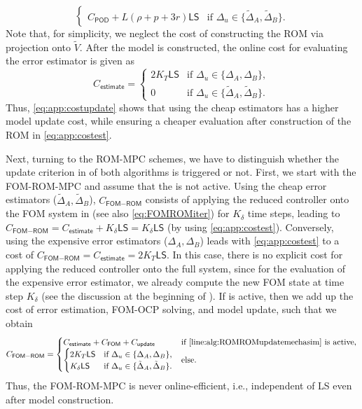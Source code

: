 \documentclass[reqno]{amsart}
\newcommand{\inpVarDim}{\rho}
\newcommand{\outVarDim}{p}
\newcommand{\nrModes}{L}
\newcommand{\abbr}[1]{\textsf{#1}\xspace}
\newcommand{\FOM}{\abbr{FOM}}
\newcommand{\ROM}{\abbr{ROM}}
\newcommand{\MPC}{\abbr{MPC}}
\newcommand{\OCP}{\abbr{OCP}}
\newcommand{\LS}{\abbr{LS}}
\newcommand{\cost}{C}
\newcommand{\costFOM}{\cost_{\FOM}}
\newcommand{\costFOMROM}{\cost_{\FOM-\ROM}}
\newcommand{\costUpdate}{\cost_{\textsf{update}}}
\newcommand{\costEst}{\cost_{\textsf{estimate}}}
\newcommand{\costPOD}{\cost_{\textsf{POD}}}
\begin{document}
{\begin{equation}
\begin{cases}
       \costPOD+\nrModes(\inpVarDim+\outVarDim+3r)\LS &\text{if }\Delta_u\in \{\tilde \Delta_A,\tilde \Delta_B\}.
	\end{cases}
\end{equation}
%
Note that, for simplicity, we neglect the cost of constructing the \ROM via projection onto $\tilde V$. After the model is constructed, the online cost for evaluating the error estimator is given as 
%
\begin{equation}\label{eq:app:costest}
    \costEst =
    \begin{cases}
        2K_T\LS &\text{if }\Delta_u\in \{\Delta_A,\Delta_B\},\\
       0 &\text{if }\Delta_u\in \{\tilde \Delta_A,\tilde \Delta_B\}.
	\end{cases}
\end{equation}
%
Thus, \eqref{eq:app:costupdate} shows that using the cheap estimators has a higher model update cost, while ensuring a cheaper evaluation after construction of the \ROM in \eqref{eq:app:costest}.

Next, turning to the \ROM-\MPC schemes, we have to distinguish whether the update criterion in  of both algorithms is triggered or not. First, we start with the \FOM-\ROM-\MPC and assume that the   is not active. Using the cheap error estimators ($\tilde \Delta_A,\tilde \Delta_B$), $\costFOMROM$ consists of applying the reduced controller onto the \FOM system in  (see also \eqref{eq:FOMROMiter}) for $K_\delta$ time steps, leading to $\costFOMROM= \costEst + K_\delta\LS= K_\delta\LS$ (by using \eqref{eq:app:costest}). Conversely, using the expensive error estimators ($ \Delta_A, \Delta_B$) leads with \eqref{eq:app:costest} to a cost of $\costFOMROM= \costEst= 2K_T\LS$. In this case, there is no explicit cost for applying the reduced controller onto the full system, since for the evaluation of the expensive error estimator, we already compute the new \FOM state at time step $K_\delta$ (see the discussion at the beginning of ). If  is active, then we add up the cost of error estimation, \FOM-\OCP solving, and model update, such that we obtain
%
\begin{equation}\label{eq:app:costFOMROM}
\costFOMROM= 
\begin{cases}
        \costEst + \costFOM + \costUpdate &\text{if \Cref{line:alg:ROMROMupdatemechasim} is active},\\
         \begin{cases}
        2K_T\LS &\text{if }\Delta_u\in \{\Delta_A,\Delta_B\},\\
        K_\delta\LS & \text{if } \Delta_u\in \{\tilde \Delta_A,\tilde \Delta_B\}.
	\end{cases} &\text{else}.
	\end{cases}
\end{equation}
%
Thus, the \FOM-\ROM-\MPC is never online-efficient, i.e., independent of \LS even after model construction.

}
\end{document}

